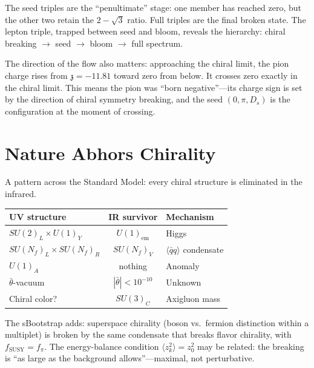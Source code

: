 \documentclass[12pt,a4paper]{article}
\newcommand{\qqbar}{\langle\bar{q}q\rangle}
\newcommand{\zch}{\mathfrak{z}}
\begin{document}
The seed triples are the ``penultimate'' stage: one member has 
reached zero, but the other two retain the $2 - \sqrt{3}$ ratio. 
Full triples are the final broken state. The lepton triple, 
trapped between seed and bloom, reveals the hierarchy: 
chiral breaking $\to$ seed $\to$ bloom $\to$ full spectrum.

The direction of the flow also matters: approaching the chiral 
limit, the pion charge rises from $\zch = -11.81$ toward zero 
from below. It crosses zero exactly in the chiral limit. This 
means the pion was ``born negative''---its charge sign is set by 
the direction of chiral symmetry breaking, and the seed 
$(0, \pi, D_s)$ is the configuration at the moment of crossing.

\section{Nature Abhors Chirality}
\label{sec:chirality}

A pattern across the Standard Model: every chiral structure is 
eliminated in the infrared.

\begin{center}
\begin{tabular}{lcl}
\toprule
UV structure & IR survivor & Mechanism \\
\midrule
$SU(2)_L \times U(1)_Y$ & $U(1)_{\text{em}}$ & Higgs \\
$SU(N_f)_L \times SU(N_f)_R$ & $SU(N_f)_V$ & $\qqbar$ condensate \\
$U(1)_A$ & nothing & Anomaly \\
$\bar{\theta}$-vacuum & $|\bar{\theta}| < 10^{-10}$ & Unknown \\
Chiral color? & $SU(3)_C$ & Axigluon mass \\
\bottomrule
\end{tabular}
\end{center}

The sBootstrap adds: superspace chirality (boson vs.\ fermion 
distinction within a multiplet) is broken by the same condensate 
that breaks flavor chirality, with $f_{\text{SUSY}} = f_\pi$. The 
energy-balance condition $\langle z_k^2\rangle = z_0^2$ may be 
related: the breaking is ``as large as the background 
allows''---maximal, not perturbative.

\end{document}
